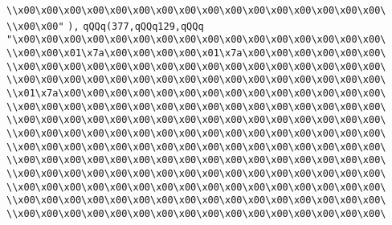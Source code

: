 \verb|\\x00\x00\x00\x00\x00\x00\x00\x00\x00\x00\x00\x00\x00\x00\x00\x00\|\newline
\verb|\\x00\x00"|\newline
\verb|),|\newline
\verb|qQQq(377,qQQq129,qQQq|\newline
\verb|"\x00\x00\x00\x00\x00\x00\x00\x00\x00\x00\x00\x00\x00\x00\x00\x00\|\newline
\verb|\\x00\x00\x01\x7a\x00\x00\x00\x00\x01\x7a\x00\x00\x00\x00\x00\x00\|\newline
\verb|\\x00\x00\x00\x00\x00\x00\x00\x00\x00\x00\x00\x00\x00\x00\x00\x00\|\newline
\verb|\\x00\x00\x00\x00\x00\x00\x00\x00\x00\x00\x00\x00\x00\x00\x00\x00\|\newline
\verb|\\x01\x7a\x00\x00\x00\x00\x00\x00\x00\x00\x00\x00\x00\x00\x00\x00\|\newline
\verb|\\x00\x00\x00\x00\x00\x00\x00\x00\x00\x00\x00\x00\x00\x00\x00\x00\|\newline
\verb|\\x00\x00\x00\x00\x00\x00\x00\x00\x00\x00\x00\x00\x00\x00\x00\x00\|\newline
\verb|\\x00\x00\x00\x00\x00\x00\x00\x00\x00\x00\x00\x00\x00\x00\x00\x00\|\newline
\verb|\\x00\x00\x00\x00\x00\x00\x00\x00\x00\x00\x00\x00\x00\x00\x00\x00\|\newline
\verb|\\x00\x00\x00\x00\x00\x00\x00\x00\x00\x00\x00\x00\x00\x00\x00\x00\|\newline
\verb|\\x00\x00\x00\x00\x00\x00\x00\x00\x00\x00\x00\x00\x00\x00\x00\x00\|\newline
\verb|\\x00\x00\x00\x00\x00\x00\x00\x00\x00\x00\x00\x00\x00\x00\x00\x00\|\newline
\verb|\\x00\x00\x00\x00\x00\x00\x00\x00\x00\x00\x00\x00\x00\x00\x00\x00\|\newline
\verb|\\x00\x00\x00\x00\x00\x00\x00\x00\x00\x00\x00\x00\x00\x00\x00\x00\|\newline
